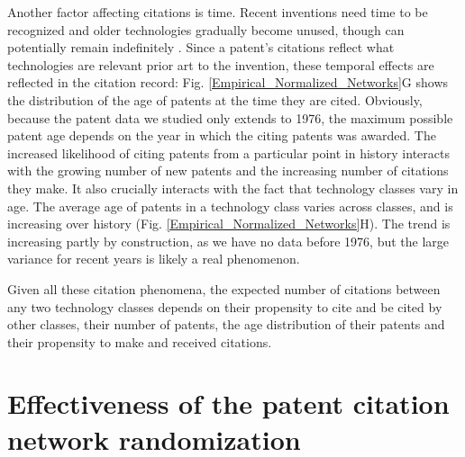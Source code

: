 \documentclass[pre,reprint,groupedaddress,superscriptaddress]{revtex4-1}
\begin{document}
Another factor affecting citations is time. Recent inventions need time to be recognized and older technologies gradually become unused, though can potentially remain indefinitely \cite{Hall2001,Valverde2007}. Since a patent's citations reflect what technologies are relevant prior art to the invention, these temporal effects are reflected in the citation record: Fig. \ref{Empirical_Normalized_Networks}G shows the distribution of the age of patents at the time they are cited. Obviously, because the patent data we studied only extends to 1976, the maximum possible patent age depends on the year in which the citing patents was awarded.
The increased likelihood of citing patents from a particular point in history interacts with the growing number of new patents and the increasing number of citations they make. It also crucially interacts with the fact that technology classes vary in age. The average age of patents in a technology class varies across classes, and is increasing over history (Fig. \ref{Empirical_Normalized_Networks}H). The trend is increasing partly by construction, as we have no data before 1976, but the large variance for recent years is likely a real phenomenon.

Given all these citation phenomena, the expected number of citations between any two technology classes depends on their propensity to cite and be cited by other classes, their number of patents, the age distribution of their patents and their propensity to make and received citations.

\section{Effectiveness of the patent citation network randomization}
\end{document}
